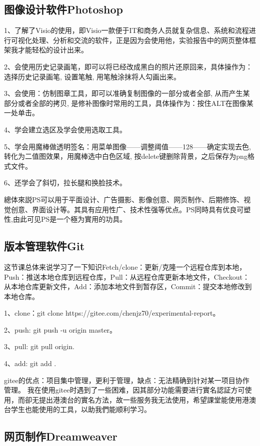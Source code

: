 \documentclass[supercite]{Experimental_Report}
\theoremstyle{definition}
\begin{document}
	\subsection{图像设计软件Photoshop}
	
	1、了解了Visio的使用，即Visio一款便于IT和商务人员就复杂信息、系统和流程进行可视化处理、分析和交流的软件，正是因为会使用他，实验报告中的网页整体框架我才能轻松的设计出来。
	
	2、会使用历史记录画笔，即可以将已经改成黑白的照片还原回来，具体操作为：选择历史记录画笔, 设置笔触, 用笔触涂抹将人勾画出来。
	
	3、会使用：仿制图章工具，即可以准确复制图像的一部分或者全部, 从而产生某部分或者全部的拷贝, 是修补图像时常用的工具，具体操作为：按住ALT在图像某一处单击。
	
	4、学会建立选区及学会使用选取工具。
	
	5、学会用魔棒做透明签名：用菜单图像——调整阈值——128——确定实现去色, 转化为二值图效果，用魔棒选中白色区域, 按delete键删除背景，之后保存为png格式文件。
	
	6、还学会了斜切，拉长腿和换脸技术。
	
	總体來説PS可以用于平面设计、广告摄影、影像创意、网页制作、后期修饰、视觉创意、界面设计等。其具有应用性广、技术性强等优点。PS同時具有优良可塑性,由此可见PS是一个極为實用的功具。
	\newpage
	\subsection{版本管理软件Git}
	
	这节课总体来说学习了一下知识Fetch/clone：更新/克隆一个远程仓库到本地，Push：推送本地仓库到远程仓库，Pull：从远程仓库更新本地文件，Checkout：从本地仓库更新文件，Add：添加本地文件到暂存区，Commit：提交本地修改到本地仓库。
	
	1、clone：git clone https://gitee.com/chenjz70/experimental-report。
	
	2、push:  git push -u origin master。
	
	3、pull:  git pull origin.
	
	4、add:   git add .
	
	gitee的优点：项目集中管理，更利于管理，缺点：无法精确到针对某一项目协作管理。
	我在使用gitee时遇到了一些困难，因其部分功能需要进行實名認証方可使用，而卻无提出港澳台的實名方法，故一些服务我无法使用，希望課堂能使用港澳台学生也能使用的工具，以助我們能顺利学习。
	\newpage
	
	\subsection{网页制作Dreamweaver}
	
\end{document}
